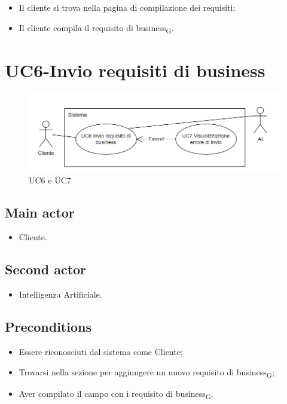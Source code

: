\documentclass{article}
\begin{document}
        \begin{itemize}
            \item Il cliente si trova nella pagina di compilazione dei requisiti;
            \item Il cliente compila il requisito di business\textsubscript{G}.
        \end{itemize}
    
\section{UC6-Invio requisiti di business}
    \begin{figure}[H]
      \centering
      \includegraphics[width=.8\textwidth, height=.6\textheight, keepaspectratio]{documenti/imgUML/UC6-INVIO-REQUISITO-DI-BUSINESS.png}
            \caption{UC6 e UC7}
      \label{fig:UC6-INVIO-REQUISITO-DI-BUSINESS}
    \end{figure}
     \subsection*{Main actor}
     \begin{itemize}
         \item Cliente.
     \end{itemize}
      \subsection*{Second actor}
     \begin{itemize}
         \item Intelligenza Artificiale.
     \end{itemize}
     \subsection*{Preconditions} 
     \begin{itemize}
         \item Essere riconosciuti dal sistema come Cliente;
         \item Trovarsi nella sezione per aggiungere un nuovo requisito di business\textsubscript{G};
         \item Aver compilato il campo con i requisito di business\textsubscript{G}.
     \end{itemize}
\end{document}

